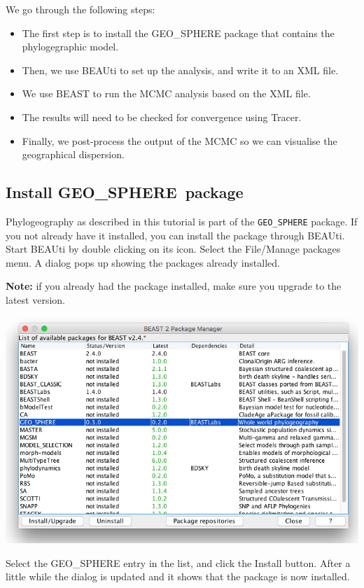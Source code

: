 \documentclass{article}
\def\beast-geo{GEO\_SPHERE}
\begin{document}
We go through the following steps:
\begin{itemize}
\item The first step is to install the \beast-geo{} package that contains the phylogegraphic model. 
\item Then, we use BEAUti to set up the analysis, and write it to an XML file.
\item We use BEAST to run the MCMC analysis based on the XML file.
\item The results will need to be checked for convergence using Tracer.
\item Finally, we post-process the output of the MCMC so we can visualise the geographical dispersion.
\end{itemize}

\subsection*{Install \beast-geo\ package}

Phylogeography as described in this tutorial is part of the {\tt \beast-geo} package.
If you not already have it installed, you can install the package through BEAUti. Start BEAUti by double clicking on its icon. 
Select the File/Manage packages menu. A dialog pops up showing the packages already installed. 

{\bf Note:} if you already had the package installed, make sure you upgrade to the latest version.

\begin{center}
\includegraphics[scale=0.4]{figures/addonmgr.png}
\end{center}

Select the \beast-geo{} entry in the list, and click the Install button. After a little while the dialog is updated and it shows that the package is now installed.
\end{document}
